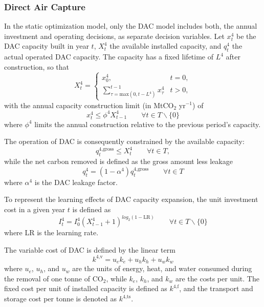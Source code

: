 \subsubsection{Direct Air Capture}
In the static optimization model, only the DAC model includes both, the annual investment and operating decisions, as separate decision variables. Let $x_t^4$ be the DAC capacity built in year $t$, $X_t^4$ the available installed capacity, and $q_t^4$ the actual operated DAC capacity. The capacity has a fixed lifetime of $L^4$ after construction, so that
\begin{equation}
X_t^4 =
    \begin{cases}
      x_0^4, & t = 0,\\
      \sum^{t-1}_{\tau=\text{max}(0,t-L^4)} x_\tau^4 & t > 0,
    \end{cases} 
\end{equation}
with the annual capacity construction limit (in MtCO$_2$ yr$^{-1}$) of
\begin{equation}
    x_t^4 \leq \phi^4X_{t-1}^4   \qquad \forall t \in T\backslash\{ 0 \}
\end{equation}
where $\phi^4$ limits the annual construction relative to the previous period's capacity.

The operation of DAC is consequently constrained by the available capacity:
\begin{equation}
q_t^\text{4,gross} \leq X_t^4  \qquad \forall t \in T,
\end{equation}
while the net carbon removed is defined as the gross amount less leakage
\begin{equation}
q_{t}^4 = (1-\alpha^4)q_t^\text{4,gross} \qquad \forall t \in T
\end{equation}
where $\alpha^4$ is the DAC leakage factor.\vspace{2mm}

To represent the learning effects of DAC capacity expansion, the unit investment cost in a given year $t$ is defined as
\begin{equation}
I_t^4 = I_0^4(X_{t-1}^4+1)^{log_2(1-\text{LR})}   \qquad \forall t \in T \backslash\{ 0 \}
\end{equation}
where LR is the learning rate.\vspace{2mm}

The variable cost of DAC is defined by the linear term
\begin{equation}
k^\text{4,v} = u_ek_e+u_hk_h+u_wk_w
\end{equation}
where $u_e$, $u_h$, and $u_w$ are the units of energy, heat, and water consumed during the removal of one tonne of CO$_2$, while $k_e$, $k_h$, and $k_w$ are the costs per unit. The fixed cost per unit of installed capacity is defined as $k^\text{4,f}$, and the transport and storage cost per tonne is denoted as $k^\text{4,ts}$.\vspace{2mm}

